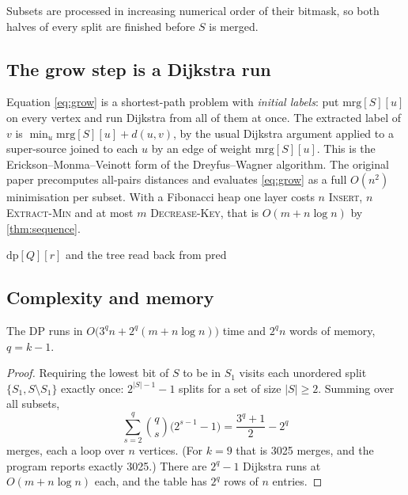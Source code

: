 \noindent Subsets are processed in increasing numerical order of their bitmask, so both halves of every split are finished before \(S\)
is merged.

\subsection{The grow step is a Dijkstra run}
Equation \eqref{eq:grow} is a shortest-path problem with \emph{initial labels}: put \(\mathrm{mrg}[S][u]\) on every vertex and
run Dijkstra from all of them at once. The extracted label of \(v\) is \(\min_u \mathrm{mrg}[S][u]+d(u,v)\), by the usual Dijkstra
argument applied to a super-source joined to each \(u\) by an edge of weight \(\mathrm{mrg}[S][u]\). This is the
Erickson--Monma--Veinott form of the Dreyfus--Wagner algorithm. The original paper precomputes all-pairs distances and
evaluates \eqref{eq:grow} as a full \(O(n^2)\) minimisation per subset. With a Fibonacci heap one layer costs \(n\) \textsc{Insert},
\(n\) \textsc{Extract-Min} and at most \(m\) \textsc{Decrease-Key}, that is \(O(m+n\log n)\) by \cref{thm:sequence}.

\begin{algorithm}[!htbp]
\Return \(\mathrm{dp}[Q][r]\) and the tree read back from \(\mathrm{pred}\)\;
\caption{DP (\texttt{src/dp\_dreyfus\_wagner.cpp}). The inner loop over \(v\) is contiguous in memory and vectorises.}
\end{algorithm}

\subsection{Complexity and memory}
\begin{theorem}\label{thm:dpcost}
The DP runs in \(O\big(3^{q}n+2^{q}(m+n\log n)\big)\) time and \(2^{q}n\) words of memory, \(q=k-1\).
\end{theorem}
\begin{proof}
Requiring the lowest bit of \(S\) to be in \(S_1\) visits each unordered split \(\{S_1,S\setminus S_1\}\) exactly once:
\(2^{|S|-1}-1\) splits for a set of size \(|S|\ge2\). Summing over all subsets,
\[\sum_{s=2}^{q}\binom{q}{s}\big(2^{s-1}-1\big)=\frac{3^{q}+1}{2}-2^{q}\]
merges, each a loop over \(n\) vertices. (For \(k=9\) that is 3025 merges, and the program reports exactly 3025.) There are
\(2^{q}-1\) Dijkstra runs at \(O(m+n\log n)\) each, and the table has \(2^{q}\) rows of \(n\) entries.
\end{proof}


